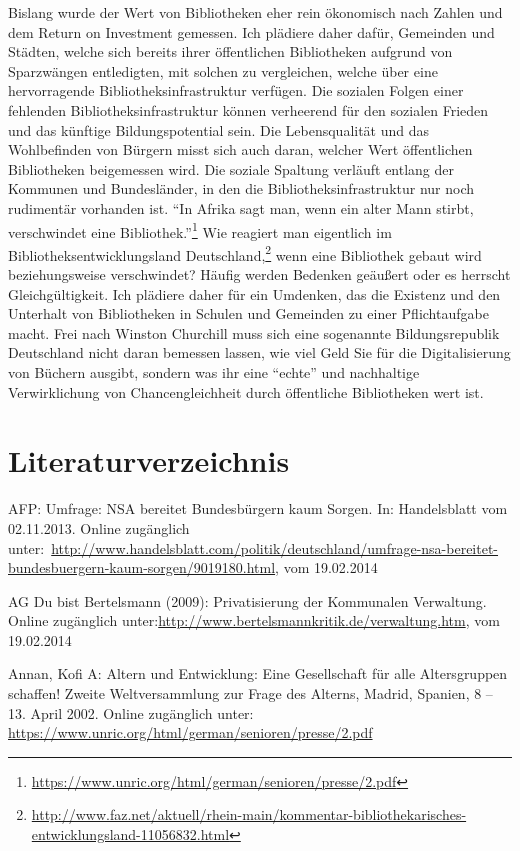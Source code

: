\documentclass[a4paper,
fontsize=11pt,
oneside,
numbers=noperiodatend,
parskip=half-,
bibliography=totoc,
final
]{scrartcl}
\begin{document}
Bislang wurde der Wert von Bibliotheken eher rein ökonomisch nach Zahlen
und dem Return on Investment gemessen. Ich plädiere daher dafür,
Gemeinden und Städten, welche sich bereits ihrer öffentlichen
Bibliotheken aufgrund von Sparzwängen entledigten, mit solchen zu
vergleichen, welche über eine hervorragende Bibliotheksinfrastruktur
verfügen. Die sozialen Folgen einer fehlenden Bibliotheksinfrastruktur
können verheerend für den sozialen Frieden und das künftige
Bildungspotential sein. Die Lebensqualität und das Wohlbefinden von
Bürgern misst sich auch daran, welcher Wert öffentlichen Bibliotheken
beigemessen wird. Die soziale Spaltung verläuft entlang der Kommunen und
Bundesländer, in den die Bibliotheksinfrastruktur nur noch rudimentär
vorhanden ist. \enquote{In Afrika sagt man, wenn ein alter Mann stirbt,
verschwindet eine Bibliothek.}\footnote{\url{https://www.unric.org/html/german/senioren/presse/2.pdf}}
Wie reagiert man eigentlich im Bibliotheksentwicklungsland
Deutschland,\footnote{\url{http://www.faz.net/aktuell/rhein-main/kommentar-bibliothekarisches-entwicklungsland-11056832.html}}
wenn eine Bibliothek gebaut wird beziehungsweise verschwindet? Häufig
werden Bedenken geäußert oder es herrscht Gleichgültigkeit. Ich plädiere
daher für ein Umdenken, das die Existenz und den Unterhalt von
Bibliotheken in Schulen und Gemeinden zu einer Pflichtaufgabe macht.
Frei nach Winston Churchill muss sich eine sogenannte Bildungsrepublik
Deutschland nicht daran bemessen lassen, wie viel Geld Sie für die
Digitalisierung von Büchern ausgibt, sondern was ihr eine
\enquote{echte} und nachhaltige Verwirklichung von Chancengleichheit
durch öffentliche Bibliotheken wert ist.

\section{Literaturverzeichnis}\label{literaturverzeichnis}

AFP: Umfrage: NSA bereitet Bundesbürgern kaum Sorgen. In: Handelsblatt
vom 02.11.2013. Online zugänglich
unter:~\url{http://www.handelsblatt.com/politik/deutschland/umfrage-nsa-bereitet-bundesbuergern-kaum-sorgen/9019180.html},
vom 19.02.2014

AG Du bist Bertelsmann (2009): Privatisierung der Kommunalen Verwaltung.
Online zugänglich
unter:\url{http://www.bertelsmannkritik.de/verwaltung.htm}, vom
19.02.2014

Annan, Kofi A: Altern und Entwicklung: Eine Gesellschaft für alle
Altersgruppen schaffen! Zweite Weltversammlung zur Frage des Alterns,
Madrid, Spanien, 8 -- 13. April 2002. Online zugänglich unter:
\url{https://www.unric.org/html/german/senioren/presse/2.pdf}
\end{document}
